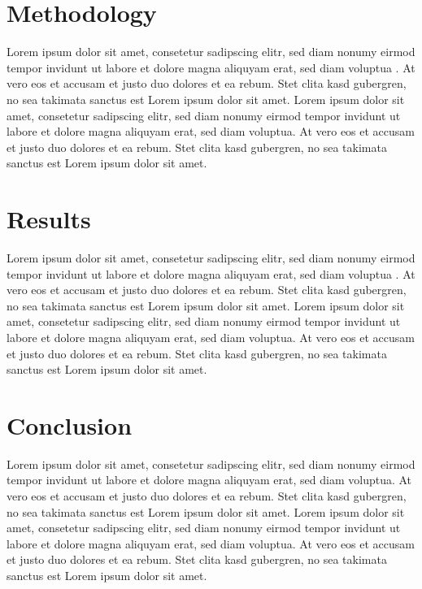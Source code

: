 \documentclass[a4paper]{article}
\begin{document}

\section{Methodology} %
\label{sec:methodology}
Lorem ipsum dolor sit amet, consetetur sadipscing elitr, sed diam nonumy eirmod tempor invidunt ut labore et dolore magna aliquyam erat, sed diam voluptua \citep{Dix04}. At vero eos et accusam et justo duo dolores et ea rebum. Stet clita kasd gubergren, no sea takimata sanctus est Lorem ipsum dolor sit amet. Lorem ipsum dolor sit amet, consetetur sadipscing elitr, sed diam nonumy eirmod tempor invidunt ut labore et dolore magna aliquyam erat, sed diam voluptua. At vero eos et accusam et justo duo dolores et ea rebum. Stet clita kasd gubergren, no sea takimata sanctus est Lorem ipsum dolor sit amet.

\section{Results} %
\label{sec:results}
Lorem ipsum dolor sit amet, consetetur sadipscing elitr, sed diam nonumy eirmod tempor invidunt ut labore et dolore magna aliquyam erat, sed diam voluptua \citep[p. 48]{Baddeley:1974ts}. At vero eos et accusam et justo duo dolores et ea rebum. Stet clita kasd gubergren, no sea takimata sanctus est Lorem ipsum dolor sit amet. Lorem ipsum dolor sit amet, consetetur sadipscing elitr, sed diam nonumy eirmod tempor invidunt ut labore et dolore magna aliquyam erat, sed diam voluptua. At vero eos et accusam et justo duo dolores et ea rebum. Stet clita kasd gubergren, no sea takimata sanctus est Lorem ipsum dolor sit amet.

\section{Conclusion} %
\label{sec:conclusion}
Lorem ipsum dolor sit amet, consetetur sadipscing elitr, sed diam nonumy eirmod tempor invidunt ut labore et dolore magna aliquyam erat, sed diam voluptua. At vero eos et accusam et justo duo dolores et ea rebum. Stet clita kasd gubergren, no sea takimata sanctus est Lorem ipsum dolor sit amet. Lorem ipsum dolor sit amet, consetetur sadipscing elitr, sed diam nonumy eirmod tempor invidunt ut labore et dolore magna aliquyam erat, sed diam voluptua. At vero eos et accusam et justo duo dolores et ea rebum. Stet clita kasd gubergren, no sea takimata sanctus est Lorem ipsum dolor sit amet.


\newpage

\listoffigures
\lstlistoflistings


\end{document}
